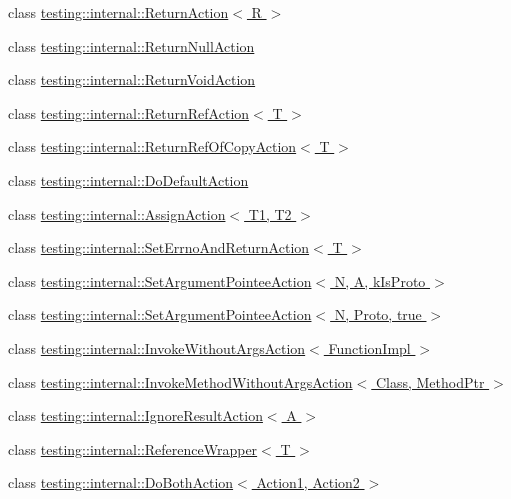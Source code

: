 \begin{DoxyCompactItemize}
\item 
class \hyperlink{classtesting_1_1internal_1_1_return_action}{testing\+::internal\+::\+Return\+Action$<$ R $>$}
\item 
class \hyperlink{classtesting_1_1internal_1_1_return_null_action}{testing\+::internal\+::\+Return\+Null\+Action}
\item 
class \hyperlink{classtesting_1_1internal_1_1_return_void_action}{testing\+::internal\+::\+Return\+Void\+Action}
\item 
class \hyperlink{classtesting_1_1internal_1_1_return_ref_action}{testing\+::internal\+::\+Return\+Ref\+Action$<$ T $>$}
\item 
class \hyperlink{classtesting_1_1internal_1_1_return_ref_of_copy_action}{testing\+::internal\+::\+Return\+Ref\+Of\+Copy\+Action$<$ T $>$}
\item 
class \hyperlink{classtesting_1_1internal_1_1_do_default_action}{testing\+::internal\+::\+Do\+Default\+Action}
\item 
class \hyperlink{classtesting_1_1internal_1_1_assign_action}{testing\+::internal\+::\+Assign\+Action$<$ T1, T2 $>$}
\item 
class \hyperlink{classtesting_1_1internal_1_1_set_errno_and_return_action}{testing\+::internal\+::\+Set\+Errno\+And\+Return\+Action$<$ T $>$}
\item 
class \hyperlink{classtesting_1_1internal_1_1_set_argument_pointee_action}{testing\+::internal\+::\+Set\+Argument\+Pointee\+Action$<$ N, A, k\+Is\+Proto $>$}
\item 
class \hyperlink{classtesting_1_1internal_1_1_set_argument_pointee_action_3_01_n_00_01_proto_00_01true_01_4}{testing\+::internal\+::\+Set\+Argument\+Pointee\+Action$<$ N, Proto, true $>$}
\item 
class \hyperlink{classtesting_1_1internal_1_1_invoke_without_args_action}{testing\+::internal\+::\+Invoke\+Without\+Args\+Action$<$ Function\+Impl $>$}
\item 
class \hyperlink{classtesting_1_1internal_1_1_invoke_method_without_args_action}{testing\+::internal\+::\+Invoke\+Method\+Without\+Args\+Action$<$ Class, Method\+Ptr $>$}
\item 
class \hyperlink{classtesting_1_1internal_1_1_ignore_result_action}{testing\+::internal\+::\+Ignore\+Result\+Action$<$ A $>$}
\item 
class \hyperlink{classtesting_1_1internal_1_1_reference_wrapper}{testing\+::internal\+::\+Reference\+Wrapper$<$ T $>$}
\item 
class \hyperlink{classtesting_1_1internal_1_1_do_both_action}{testing\+::internal\+::\+Do\+Both\+Action$<$ Action1, Action2 $>$}
\end{DoxyCompactItemize}
